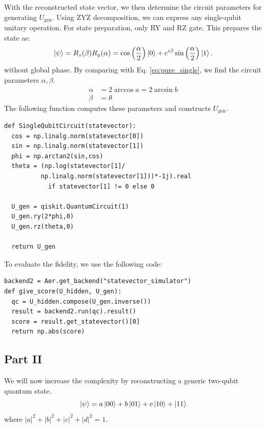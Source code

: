\documentclass[a4paper, 11pt]{article}
\begin{document}
With the reconstructed state vector, we then determine the circuit parameters for generating $U_{\text{gen}}$.
Using ZYZ decomposition, we can express any single-qubit unitary operation. 
For state preparation, only RY and RZ gate\cite{PhysRevA.93.032318, nielsen2010quantum, PhysRevA.52.3457}. This prepares the state as:
\begin{equation}
  \ket{\psi} = R_z (\beta) R_y (\alpha) = \cos \left( \frac{\alpha}{2} \right) \ket{0} + e^{i\beta} \sin \left( \frac{\alpha}{2} \right)\ket{1}.
\end{equation}
without global phase.
By comparing with Eq. \ref{eq:pure_single}, we find the circuit parameters $\alpha, \beta$. 
\begin{align}
  \alpha &= 2\arccos a = 2\arcsin b \\
  \beta &= \theta
\end{align}
The following function computes these parameters and constructs $U_{\text{gen}}$.
\begin{verbatim}
def SingleQubitCircuit(statevector):
  cos = np.linalg.norm(statevector[0])
  sin = np.linalg.norm(statevector[1])
  phi = np.arctan2(sin,cos)
  theta = (np.log(statevector[1]/ 
          np.linalg.norm(statevector[1]))*-1j).real 
            if statevector[1] != 0 else 0

  U_gen = qiskit.QuantumCircuit(1)
  U_gen.ry(2*phi,0)
  U_gen.rz(theta,0)

  return U_gen
\end{verbatim}

To evaluate the fidelity, we use the following code:
\begin{verbatim}
backend2 = Aer.get_backend("statevector_simulator")
def give_score(U_hidden, U_gen):
  qc = U_hidden.compose(U_gen.inverse())
  result = backend2.run(qc).result()
  score = result.get_statevector()[0]
  return np.abs(score)
\end{verbatim}

\subsection*{Part II}
We will now increase the complexity by reconstructing a generic two-qubit quantum state.
\begin{equation}
  \ket{\psi} = a\ket{00} + b\ket{01} + c\ket{10} + \ket{11}
\end{equation}
where $|a|^2 + |b|^2 + |c|^2 + |d|^2 = 1$.
\end{document}
